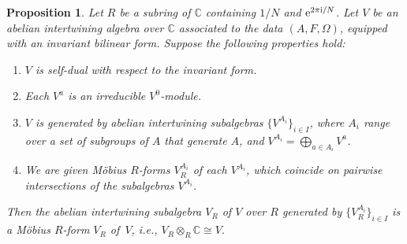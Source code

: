 \documentclass[pdftex]{sigma}
\newcommand{\bC}{\mathbb{C}}
\newtheorem{prop}[thm]{Proposition}
\theoremstyle{definition}
\begin{document}
\begin{prop} \label{prop:existence-of-R-form-of-abelian-intertwining-algebra} Let $R$ be a subring of $\bC$ containing $1/N$ and ${\rm e}^{2\pi {\rm i}/N}$. Let $V$ be an abelian intertwining algebra over $\bC$ associated to the data $(A,F,\Omega)$, equipped with an invariant bilinear form. Suppose the following properties hold:
\begin{enumerate}\itemsep=0pt
\item[$1.$] $V$ is self-dual with respect to the invariant form.
\item[$2.$] Each $V^a$ is an irreducible $V^0$-module.
\item[$3.$] $V$ is generated by abelian intertwining subalgebras $\big\{V^{A_i}\big\}_{i \in I}$, where $A_i$ range over a set of subgroups of $A$ that generate $A$, and $V^{A_i} = \bigoplus_{a \in A_i} V^a$.
\item[$4.$] We are given M\"obius $R$-forms $V^{A_i}_R$ of each $V^{A_i}$, which coincide on pairwise intersections of the subalgebras $V^{A_i}$.
\end{enumerate}
Then the abelian intertwining subalgebra $V_R$ of $V$ over $R$ generated by $\big\{ V^{A_i}_R \big\}_{i \in I}$ is a M\"obius $R$-form $V_R$ of~$V$, i.e., $V_R \otimes_{R} \bC \cong V$.
\end{prop}
\end{document}
